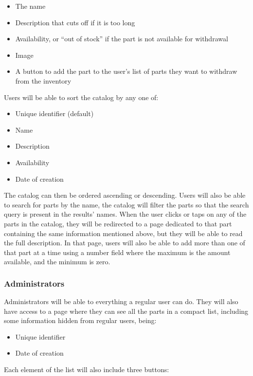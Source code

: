 \documentclass[12pt, letterpaper]{article}
\begin{document}
\begin{itemize}
  \item The name
  \item Description that cuts off if it is too long
  \item Availability, or ``out of stock'' if the part is not available for withdrawal
  \item Image
  \item A button to add the part to the user's list of parts they want to withdraw from the inventory
\end{itemize}

Users will be able to sort the catalog by any one of:

\begin{itemize}
  \item Unique identifier (default)
  \item Name
  \item Description
  \item Availability
  \item Date of creation
\end{itemize}

The catalog can then be ordered ascending or descending. Users will also be able to search for parts by the name, the catalog will filter the parts so that the search query is present in the results' names. When the user clicks or taps on any of the parts in the catalog, they will be redirected to a page dedicated to that part containing the same information mentioned above, but they will be able to read the full description. In that page, users will also be able to add more than one of that part at a time using a number field where the maximum is the amount available, and the minimum is zero.

\subsubsection{Administrators}

Administrators will be able to everything a regular user can do. They will also have access to a page where they can see all the parts in a compact list, including some information hidden from regular users, being:

\begin{itemize}
  \item Unique identifier
  \item Date of creation
\end{itemize}

Each element of the list will also include three buttons:
\end{document}
